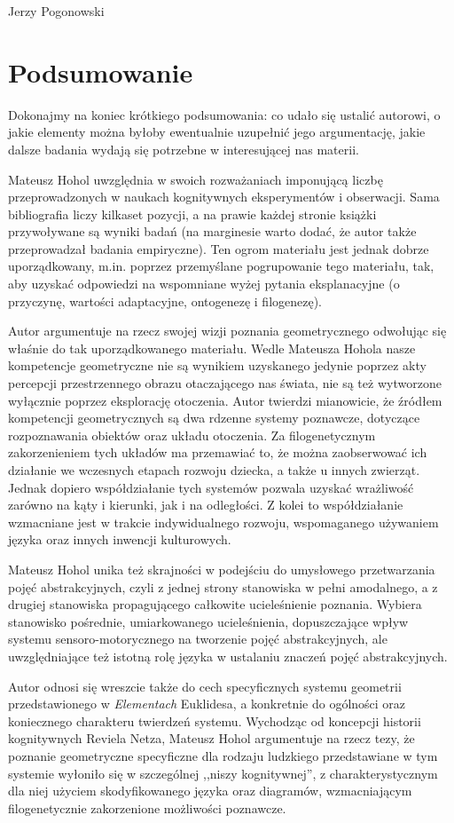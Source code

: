 \begin{newrevengenv}{Jerzy Pogonowski}
\section{Podsumowanie}

Dokonajmy na koniec krótkiego podsumowania: co udało się ustalić
autorowi, o jakie elementy można byłoby ewentualnie uzupełnić jego
argumentację, jakie dalsze badania wydają się potrzebne w
interesującej nas materii.

Mateusz Hohol uwzględnia w swoich rozważaniach imponującą liczbę
przeprowadzonych w naukach kognitywnych eksperymentów i
obserwacji. Sama bibliografia liczy kilkaset pozycji, a na prawie
każdej stronie książki przywoływane są wyniki badań (na marginesie
warto dodać, że autor także przeprowadzał badania empiryczne). Ten
ogrom materiału jest jednak dobrze uporządkowany, m.in. poprzez
przemyślane pogrupowanie tego materiału, tak, aby uzyskać
odpowiedzi na wspomniane wyżej pytania eksplanacyjne (o przyczynę,
wartości adaptacyjne, ontogenezę i filogenezę).

Autor argumentuje na rzecz swojej wizji poznania geometrycznego
odwołując się właśnie do tak uporządkowanego materiału. Wedle
Mateusza Hohola nasze kompetencje geometryczne nie są wynikiem
uzyskanego jedynie poprzez akty percepcji przestrzennego obrazu
otaczającego nas świata, nie są też wytworzone wyłącznie poprzez
eksplorację otoczenia. Autor twierdzi mianowicie, że źródłem
kompetencji geometrycznych są dwa rdzenne systemy poznawcze,
dotyczące rozpoznawania obiektów oraz układu otoczenia. Za
filogenetycznym zakorzenieniem tych układów ma przemawiać to, że
można zaobserwować ich działanie we wczesnych etapach rozwoju
dziecka, a także u innych zwierząt. Jednak dopiero współdziałanie
tych systemów pozwala uzyskać wrażliwość zarówno na kąty i
kierunki, jak i na odległości. Z kolei to współdziałanie
wzmacniane jest w trakcie indywidualnego rozwoju, wspomaganego
używaniem języka oraz innych inwencji kulturowych.

Mateusz Hohol unika też skrajności w podejściu do umysłowego
przetwarzania pojęć abstrakcyjnych, czyli z jednej strony
stanowiska w pełni amodalnego, a z drugiej stanowiska
propagującego całkowite ucieleśnienie poznania. Wybiera stanowisko
pośrednie, umiarkowanego ucieleśnienia, dopuszczające wpływ
systemu sensoro-motorycznego na tworzenie pojęć abstrakcyjnych,
ale uwzględniające też istotną rolę języka w ustalaniu znaczeń
pojęć abstrakcyjnych.

Autor odnosi się wreszcie także do cech specyficznych systemu
geometrii przedstawionego w {\em Elementach} Euklidesa, a
konkretnie do ogólności oraz koniecznego charakteru twierdzeń
systemu. Wychodząc od koncepcji historii kognitywnych Reviela
Netza, Mateusz Hohol argumentuje na rzecz tezy, że poznanie
geometryczne specyficzne dla rodzaju ludzkiego przedstawiane w tym
systemie wyłoniło się w szczególnej ,,niszy kognitywnej'', z
charakterystycznym dla niej użyciem skodyfikowanego języka oraz
diagramów, wzmacniającym filogenetycznie zakorzenione możliwości
poznawcze.


\end{newrevengenv}
